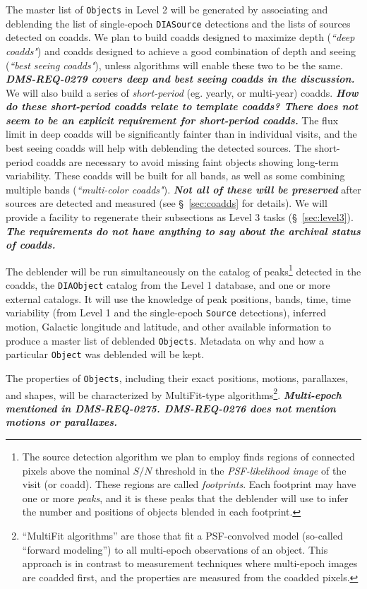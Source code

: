 \documentclass[12pt]{article}
\newcommand{\code}[1]{\texttt{#1}}
\newcommand{\annotate}[1]{{\color{magenta}\large\textbf{\emph{#1}}}}
\newcommand{\DIASource}{\code{DIASource}\xspace}
\newcommand{\DIAObject}{\code{DIAObject}\xspace}
\newcommand{\DB}{{Level 1 database}\xspace}
\newcommand{\Object}{\code{Object}\xspace}
\newcommand{\Objects}{\code{Objects}\xspace}
\newcommand{\Source}{\code{Source}\xspace}
\newcommand{\req}[1]{\marginpar{\tiny #1}}
\newcommand{\dmreq}[1]{\req{DMS-REQ-#1}}
\begin{document}
The master list of \Objects in Level 2 will be generated by associating and deblending the list of single-epoch \DIASource detections and the lists of sources detected on coadds.\dmreq{0034} We plan to build coadds designed to maximize depth ({\em ``deep coadds"})\dmreq{0279} and coadds designed to achieve a good combination of depth and seeing ({\em ``best seeing coadds"}), unless
algorithms will enable these two to be the same. \annotate{DMS-REQ-0279 covers deep and best seeing coadds in the discussion.}
We will also build a series of {\em short-period} (eg. yearly, or multi-year) coadds.
\annotate{How do these short-period coadds relate to template coadds? There does not seem to be an explicit requirement for short-period coadds.}
The flux limit in deep coadds will be significantly fainter than in individual visits, and the best seeing coadds will help with deblending the detected sources. The short-period coadds are necessary to avoid missing faint objects showing long-term variability. These coadds will be built for all bands, as well as some combining multiple bands ({\em ``multi-color coadds"}).\dmreq{0281} {\bf \em Not all of these will be preserved} after sources are detected and measured (see \S~\ref{sec:coadds} for details). We will provide a facility to regenerate their subsections as Level 3 tasks (\S~\ref{sec:level3}).
\annotate{The requirements do not have anything to say about the archival status of coadds.}

\dmreq{0275}
The deblender will be run simultaneously on the catalog of peaks\footnote{The source detection algorithm we plan to employ finds regions of connected pixels above the nominal $S/N$ threshold in the {\em PSF-likelihood image} of the visit (or coadd). These regions are called {\em footprints}. Each footprint may have one or more {\em peaks}, and it is these peaks that the deblender will use to infer the number and positions of objects blended in each footprint.} detected in the coadds, the \DIAObject catalog from the \DB, and one or more external catalogs.  It will use the knowledge of peak positions, bands, time, time variability (from Level 1 and the single-epoch \Source detections), inferred motion, Galactic longitude and latitude, and other available information to produce a master list of deblended \Objects. Metadata on why and how a particular \Object was deblended will be kept.

\dmreq{0276}
The properties of \Objects, including their exact positions, motions, parallaxes, and shapes, will be characterized by MultiFit-type algorithms\footnote{``MultiFit algorithms'' are those that fit a PSF-convolved model (so-called ``forward modeling'')  to all multi-epoch observations of an object. This approach is in contrast to measurement techniques where multi-epoch images are coadded first, and the properties are measured from the coadded pixels.}.
\annotate{Multi-epoch mentioned in DMS-REQ-0275. DMS-REQ-0276 does not mention motions or parallaxes.}
\end{document}
